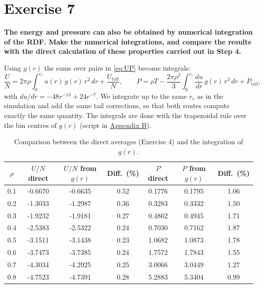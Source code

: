 \documentclass[a4paper,11pt]{article}
\newcommand{\exercise}[1]{\section*{Exercise #1}\addcontentsline{toc}{section}{Exercise #1}}
\newcommand{\statement}[1]{\textbf{#1}\par}
\begin{document}
\exercise{7}
\statement{The energy and pressure can also be obtained by numerical integration of the RDF. Make
the numerical integrations, and compare the results with the direct calculation of these properties
carried out in Step 4.}

Using $g(r)$ the sums over pairs in \cref{eq:UP} become integrals:
\begin{equation}
  \frac{U}{N} = 2\pi\rho\int_0^{r_c} u(r)\,g(r)\,r^2\,dr + \frac{U_{\text{tail}}}{N},
  \qquad
  P = \rho T - \frac{2\pi\rho^2}{3}\int_0^{r_c} \frac{du}{dr}\,g(r)\,r^3\,dr + P_{\text{tail}},
  \label{eq:integrals}
\end{equation}
with $du/dr = -48r^{-13}+24r^{-7}$. We integrate up to the same $r_c$ as in the simulation and add
the same tail corrections, so that both routes compute exactly the same quantity. The integrals are
done with the trapezoidal rule over the bin centres of $g(r)$ (script in \hyperref[app:python]{Appendix B}).

\begin{table}[H]
  \centering
  \caption{Comparison between the direct averages (Exercise 4) and the integration of $g(r)$.}
  \label{tab:ex7}
  \begin{tabular}{S[table-format=1.1]
                  S[table-format=-1.4] S[table-format=-1.4] S[table-format=1.2]
                  S[table-format=1.4] S[table-format=1.4] S[table-format=1.2]}
    \toprule
    {$\rho$} & {$U/N$ direct} & {$U/N$ from $g(r)$} & {Diff.\ (\si{\percent})}
             & {$P$ direct} & {$P$ from $g(r)$} & {Diff.\ (\si{\percent})} \\
     & -0.6670 & -0.6635 & 0.52 & 0.1776 & 0.1795 & 1.06 \\
    0.2 & -1.3033 & -1.2987 & 0.36 & 0.3283 & 0.3332 & 1.50 \\
    0.3 & -1.9232 & -1.9181 & 0.27 & 0.4862 & 0.4945 & 1.71 \\
    0.4 & -2.5383 & -2.5322 & 0.24 & 0.7030 & 0.7162 & 1.87 \\
    0.5 & -3.1511 & -3.1438 & 0.23 & 1.0682 & 1.0873 & 1.78 \\
    0.6 & -3.7473 & -3.7385 & 0.24 & 1.7572 & 1.7843 & 1.55 \\
    0.7 & -4.3034 & -4.2925 & 0.25 & 3.0066 & 3.0449 & 1.27 \\
    0.8 & -4.7523 & -4.7391 & 0.28 & 5.2883 & 5.3404 & 0.99 \\
    \bottomrule
  \end{tabular}
\end{table}
\end{document}
